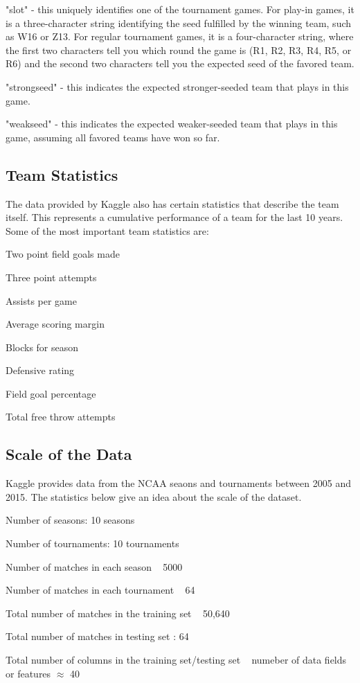 \documentclass{article}
\begin{document}
\begin{multicols}{2}
\begin{list}{Field}{}
\item
"slot" - this uniquely identifies one of the tournament games. For play-in games, it is a three-character string identifying the seed fulfilled by the winning team, such as W16 or Z13. For regular tournament games, it is a four-character string, where the first two characters tell you which round the game is (R1, R2, R3, R4, R5, or R6) and the second two characters tell you the expected seed of the favored team.
\item
"strongseed" - this indicates the expected stronger-seeded team that plays in this game.
\item
"weakseed" - this indicates the expected weaker-seeded team that plays in this game, assuming all favored teams have won so far.
\end{list}
	
	\subsection{Team Statistics}
	The data provided by Kaggle also has certain statistics that describe the team itself. This represents a cumulative performance of a team for the last 10 years. Some of the most important team statistics are:
	\begin{list}{•}{•}
\item
	Two point field goals made 
\item
Three point attempts
\item
Assists per game
\item
Average scoring margin
\item
Blocks for season
\item
Defensive rating
\item
Field goal percentage
\item
Total free throw attempts
	\end{list}
	\subsection{Scale of the Data}
	Kaggle provides data from the NCAA seaons and tournaments between 2005 and 2015. The statistics below give an idea about the scale of the dataset.	
\begin{list}{•}
\item
Number of seasons: 10 seasons
\item
Number of tournaments: 10 tournaments
\item
Number of matches in each season ~ 5000
\item
Number of matches in each tournament ~ 64
\item
Total number of matches in the training set ~ 50,640
\item
Total number of matches in testing set : 64
\item
Total number of columns in the training set/testing set ~ numeber of data fields or features $\approx$ 40
\end{list}


\end{multicols}
\end{document}
